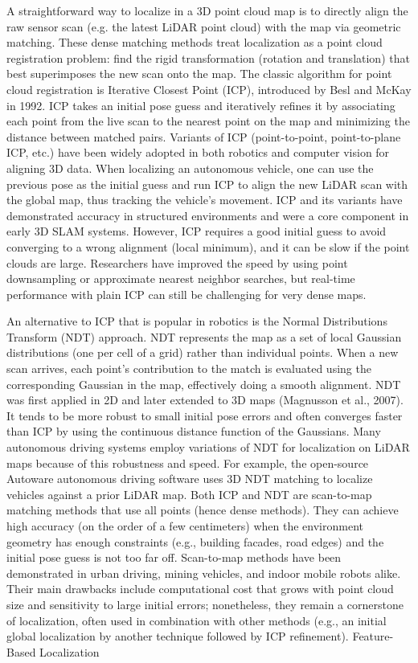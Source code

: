 A straightforward way to localize in a 3D point cloud map is to directly align the raw sensor scan (e.g. the latest LiDAR point cloud) with the map via geometric matching. These dense matching methods treat localization as a point cloud registration problem: find the rigid transformation (rotation and translation) that best superimposes the new scan onto the map. The classic algorithm for point cloud registration is Iterative Closest Point (ICP), introduced by Besl and McKay in 1992. ICP takes an initial pose guess and iteratively refines it by associating each point from the live scan to the nearest point on the map and minimizing the distance between matched pairs. Variants of ICP (point-to-point, point-to-plane ICP, etc.) have been widely adopted in both robotics and computer vision for aligning 3D data. When localizing an autonomous vehicle, one can use the previous pose as the initial guess and run ICP to align the new LiDAR scan with the global map, thus tracking the vehicle’s movement. ICP and its variants have demonstrated accuracy in structured environments and were a core component in early 3D SLAM systems. However, ICP requires a good initial guess to avoid converging to a wrong alignment (local minimum), and it can be slow if the point clouds are large. Researchers have improved the speed by using point downsampling or approximate nearest neighbor searches, but real-time performance with plain ICP can still be challenging for very dense maps.

An alternative to ICP that is popular in robotics is the Normal Distributions Transform (NDT) approach. NDT represents the map as a set of local Gaussian distributions (one per cell of a grid) rather than individual points. When a new scan arrives, each point’s contribution to the match is evaluated using the corresponding Gaussian in the map, effectively doing a smooth alignment. NDT was first applied in 2D and later extended to 3D maps (Magnusson et al., 2007). It tends to be more robust to small initial pose errors and often converges faster than ICP by using the continuous distance function of the Gaussians. Many autonomous driving systems employ variations of NDT for localization on LiDAR maps because of this robustness and speed. For example, the open-source Autoware autonomous driving software uses 3D NDT matching to localize vehicles against a prior LiDAR map. Both ICP and NDT are scan-to-map matching methods that use all points (hence dense methods). They can achieve high accuracy (on the order of a few centimeters) when the environment geometry has enough constraints (e.g., building facades, road edges) and the initial pose guess is not too far off. Scan-to-map methods have been demonstrated in urban driving, mining vehicles, and indoor mobile robots alike. Their main drawbacks include computational cost that grows with point cloud size and sensitivity to large initial errors; nonetheless, they remain a cornerstone of localization, often used in combination with other methods (e.g., an initial global localization by another technique followed by ICP refinement).
Feature-Based Localization

